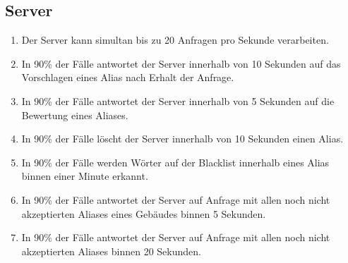 \subsection{Server}

\begin{enumerate}
    \item Der Server kann simultan bis zu 20 Anfragen pro Sekunde verarbeiten.
    \item In 90\% der Fälle antwortet der Server innerhalb von 10 Sekunden auf das Vorschlagen eines Alias nach Erhalt der Anfrage.
    \item In 90\% der Fälle antwortet der Server innerhalb von 5 Sekunden auf die Bewertung eines Aliases.
    \item In 90\% der Fälle löscht der Server innerhalb von 10 Sekunden einen Alias.
    \item In 90\% der Fälle werden Wörter auf der Blacklist innerhalb eines Alias binnen einer Minute erkannt.
    \item In 90\% der Fälle antwortet der Server auf Anfrage mit allen noch nicht akzeptierten Aliases eines Gebäudes binnen 5 Sekunden.
    \item In 90\% der Fälle antwortet der Server auf Anfrage mit allen noch nicht akzeptierten Aliases binnen 20 Sekunden.
\end{enumerate}
